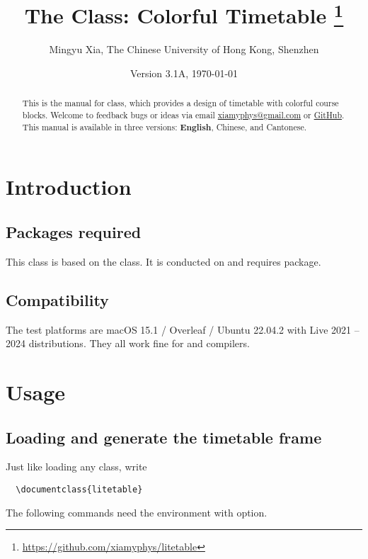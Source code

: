 \documentclass[letterpaper]{l3doc}
\title
{
  The \cls{litetable} Class: Colorful Timetable
  \thanks{\url{https://github.com/xiamyphys/litetable}}
}
\author{Mingyu Xia, The Chinese University of Hong Kong, Shenzhen}
\affil{\href{mailto:xiamyphys@gmail.com}{xiamyphys@gmail.com}}
\date{Version 3.1A, \today}
\begin{document}
\maketitle

\begin{abstract}
  This is the manual for  class, which provides a design of timetable with colorful course blocks. Welcome to feedback bugs or ideas via email \href{mailto:xiamyphys@gmail.com}{xiamyphys@gmail.com} or \href{https://github.com/xiamyphys/litetable/issues}{GitHub}. This manual is available in three versions: \textbf{English}, Chinese, and Cantonese.
\end{abstract}

\section{Introduction}

\subsection{Packages required}

This class is based on the  class. It is conducted on  and requires  package.

\subsection{Compatibility}

The test platforms are macOS 15.1 / Overleaf / Ubuntu 22.04.2 with Live 2021 -- 2024 distributions. They all work fine for  and  compilers.

\section{Usage}

\subsection{Loading  and generate the timetable frame}

Just like loading any class, write

\begin{Verbatim}
  \documentclass{litetable}
\end{Verbatim}

The following commands need the  environment with  option.
\end{document}
